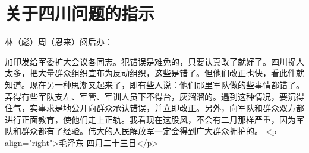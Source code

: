 \section[关于四川问题的指示（一九六七年四月二十三日）]{关于四川问题的指示}


林（彪）周（恩来）阅后办：

加印发给军委扩大会议各同志。犯错误是难免的，只要认真改了就好了。四川捉人太多，把大量群众组织宣布为反动组织，这些是错了。但他们改正也快，看此件就知道。现在另一种思潮又起来了，即有些人说：他们那里军队做的些事情都错了。弄得有些军队支左、军管、军训人员下不得台，灰溜溜的。遇到这种情况，要沉得住气，实事求是地公开向群众承认错误，并立即改正。另外，向军队和群众双方都进行正面教育，使他们走上正轨。我看现在这股风，不会有二月那样严重，因为军队和群众都有了经验。伟大的人民解放军一定会得到广大群众拥护的。
<p align="right">毛泽东
四月二十三日</p>



